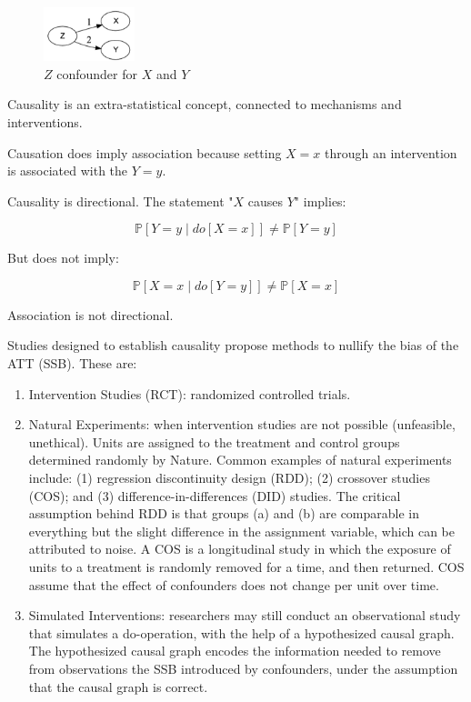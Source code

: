 \documentclass{article}
\begin{document}
\begin{figure}[H]
  \centering
  \includegraphics[width=100px]{draft-photos/confounder_variable.png}
  \caption{$Z$ confounder for $X$ and $Y$}
  \label{fig:confounder_variable}
\end{figure}

Causality is an extra-statistical concept, connected to mechanisms and interventions.

Causation does imply association because setting $X = x$ through an intervention is associated with the $Y = y$.

Causality is directional. The statement "$X$ causes $Y$" implies:

$$
\mathbb{P}[Y = y \mid do[X = x]] \neq \mathbb{P}[Y = y]
$$

But does not imply:

$$
\mathbb{P}[X = x \mid do[Y = y]] \neq \mathbb{P}[X = x]
$$

Association is not directional.

Studies designed to establish causality propose methods to nullify the bias of the ATT (SSB). These are:

\begin{enumerate}
  \item Intervention Studies (RCT): randomized controlled trials.
  \item Natural Experiments: when intervention studies are not possible (unfeasible, unethical). Units are assigned to the treatment and control groups determined randomly by Nature. Common examples of natural experiments include: (1) regression discontinuity design (RDD); (2) crossover studies (COS); and (3) difference-in-differences (DID) studies. The critical assumption behind RDD is that groups (a) and (b) are comparable in everything but the slight difference in the assignment variable, which can be attributed to noise. A COS is a longitudinal study in which the exposure of units to a treatment is randomly removed for a time, and then returned. COS assume that the effect of confounders does not change per unit over time.
  \item Simulated Interventions: researchers may still conduct an observational study that simulates a do-operation, with the help of a hypothesized causal graph. The hypothesized causal graph encodes the information needed to remove from observations the SSB introduced by confounders, under the assumption that the causal graph is correct.
\end{enumerate}
\end{document}
